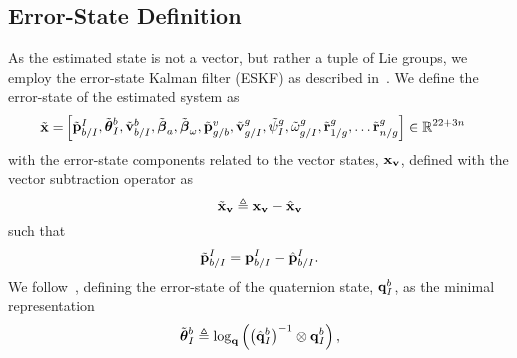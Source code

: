 
\subsection{Error-State Definition}

As the estimated state is not a vector, but rather a tuple of Lie groups, we
employ the error-state Kalman filter (ESKF) as described in~\cite{koch2017relative}.
We define the error-state of the estimated system as
\begin{align}
  \tilde{\boldsymbol{\mathrm{x}}} =&
  \left[ \begin{matrix}
    \tilde{\boldsymbol{\mathrm{p}}}_{b/I}^{I}, \tilde{\boldsymbol{\mathrm{\theta}}}_I^{b}, \tilde{\boldsymbol{\mathrm{v}}}_{b/I}^b,
    \tilde{\boldsymbol{\mathrm{\beta}}}_a,
    \tilde{\boldsymbol{\mathrm{\beta}}}_{\omega},
    \tilde{\boldsymbol{\mathrm{p}}}_{g/b}^{v}, \tilde{\boldsymbol{\mathrm{v}}}_{g/I}^{g}, \tilde{\psi}_{I}^{g},
    \tilde{\omega}_{g/I}^{g},
      \tilde{\boldsymbol{\mathrm{r}}}_{1/g}^{g}, \dots \tilde{\boldsymbol{\mathrm{r}}}_{n/g}^{g}
  \end{matrix} \right]
  \in \mathbb{R}^{22 + 3n}
\end{align}
with the error-state components related to the vector states, $\boldsymbol{\mathrm{x}}_{\boldsymbol{\mathrm{v}}}$, defined with
the vector subtraction operator as
\begin{equation}
\tilde{\boldsymbol{\mathrm{x}}}_{\boldsymbol{\mathrm{v}}} \triangleq \boldsymbol{\mathrm{x}}_{\boldsymbol{\mathrm{v}}} - \hat{\boldsymbol{\mathrm{x}}}_{\boldsymbol{\mathrm{v}}}
\label{eq:est_paper_vector_error_state}
\end{equation}
such that
\begin{equation}
  \tilde{\boldsymbol{\mathrm{p}}}_{b/I}^I = \boldsymbol{\mathrm{p}}_{b/I}^I - \hat{\boldsymbol{\mathrm{p}}}_{b/I}^I.
  \label{eq:est_paper_uav_pos_err_state}
\end{equation}
We follow~\cite{koch2017relative}, defining the error-state of the quaternion
state,
$\boldsymbol{\mathrm{q}}_I^b$,
as the minimal representation
\begin{equation}
  \tilde{\boldsymbol{\mathrm{\theta}}}_I^b \triangleq \log_{\boldsymbol{\mathrm{q}}} \left( \left( \hat{\boldsymbol{\mathrm{q}}}_I^b \right)^{-1}
  \otimes \boldsymbol{\mathrm{q}}_I^b \right),
  \label{eq:quat_error_state}
\end{equation}

